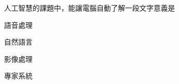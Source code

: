 \ifx\ntpcNinetyTwo\undefined[92學年基北區] \fi
人工智慧的課題中，能讓電腦自動了解一段文字意義是
  \begin{optionlist}
  \item 語音處理
  \item 自然語言\label{ntpc-92-a2}
  \item 影像處理
  \item 專家系統
  \end{optionlist}